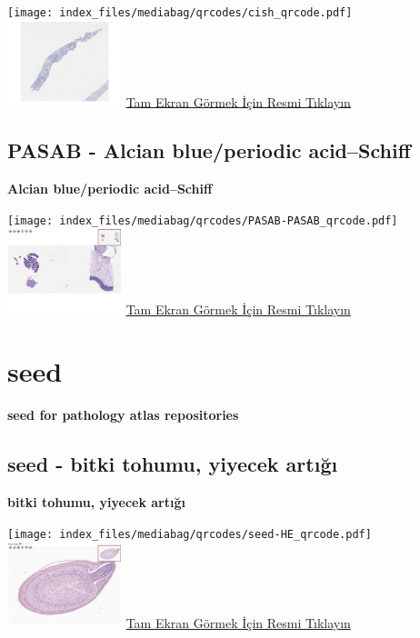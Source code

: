 \documentclass[
  letterpaper,
  DIV=11,
  numbers=noendperiod]{scrreprt}
\begin{document}
\texttt{[image: index\_files/mediabag/qrcodes/cish\_qrcode.pdf]}
\href{https://images.patolojiatlasi.com/her2-cish/cish.html}{\includegraphics[width=0.25\textwidth,height=\textheight]{./screenshots/thumbnail_cish.png}}
\href{https://images.patolojiatlasi.com/her2-cish/cish.html}{Tam Ekran
Görmek İçin Resmi Tıklayın}

\section{PASAB - Alcian blue/periodic acid--Schiff}\label{sec-PASAB}

\textbf{Alcian blue/periodic acid--Schiff}

\texttt{[image: index\_files/mediabag/qrcodes/PASAB-PASAB\_qrcode.pdf]}
\href{https://images.patolojiatlasi.com/PASAB/PASAB.html}{\includegraphics[width=0.25\textwidth,height=\textheight]{./screenshots/thumbnail_PASAB-PASAB.png}}
\href{https://images.patolojiatlasi.com/PASAB/PASAB.html}{Tam Ekran
Görmek İçin Resmi Tıklayın}

\chapter{seed}\label{seed}

\textbf{seed for pathology atlas repositories}

\section{seed - bitki tohumu, yiyecek artığı}\label{sec-seed}

\textbf{bitki tohumu, yiyecek artığı}

\texttt{[image: index\_files/mediabag/qrcodes/seed-HE\_qrcode.pdf]}
\href{https://images.patolojiatlasi.com/seed/HE.html}{\includegraphics[width=0.25\textwidth,height=\textheight]{./screenshots/thumbnail_seed-HE.png}}
\href{https://images.patolojiatlasi.com/seed/HE.html}{Tam Ekran Görmek
İçin Resmi Tıklayın}
\end{document}
